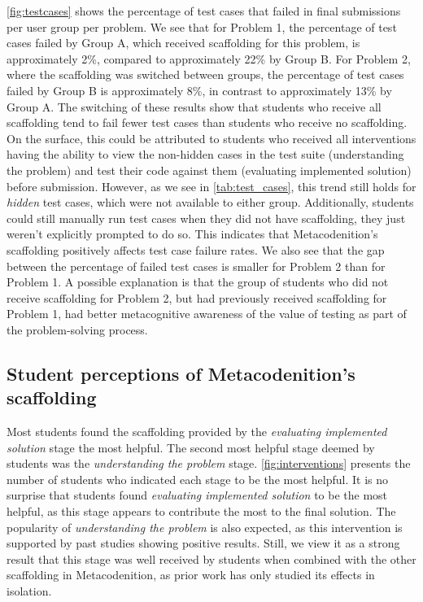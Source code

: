 \documentclass[sigconf,anonymous]{acmart}
\begin{document}
\autoref{fig:testcases} shows the percentage of test cases that failed in final submissions per user group per problem. We see that for Problem 1, the percentage of test cases failed by Group A, which received scaffolding for this problem, is approximately 2\%, compared to approximately 22\% by Group B. For Problem 2, where the scaffolding was switched between groups, the percentage of test cases failed by Group B is approximately 8\%, in contrast to approximately 13\% by Group A. The switching of these results show that students who receive all scaffolding tend to fail fewer test cases than students who receive no scaffolding. On the surface, this could be attributed to students who received all interventions having the ability to view the non-hidden cases in the test suite (understanding the problem) and test their code against them  (evaluating implemented solution) before submission. However, as we see in \autoref{tab:test_cases}, this trend still holds for \emph{hidden} test cases, which were not available to either group. 
Additionally, students could still manually run test cases when they did not have scaffolding, they just weren't explicitly prompted to do so. 
This indicates that Metacodenition's scaffolding positively affects test case failure rates. We also see that the gap between the percentage of failed test cases is smaller for Problem 2 than for Problem 1. A possible explanation is that the group of students who did not receive scaffolding for Problem 2, but had previously received scaffolding for Problem 1, had better metacognitive awareness of the value of testing as part of the problem-solving process. 


\subsection{Student perceptions of Metacodenition's scaffolding} \label{sec:results-questionnaire}
Most students found the scaffolding provided by the \emph{evaluating implemented solution} stage the most helpful. The second most helpful stage deemed by students was the \emph{understanding the problem} stage. \autoref{fig:interventions} presents the number of students who indicated each stage to be the most helpful. It is no surprise that students found \emph{evaluating implemented solution} to be the most helpful, as this stage appears to contribute the most to the final solution. The popularity of \emph{understanding the problem} is also expected, as this intervention is supported by past studies showing positive results. Still, we view it as a strong result that this stage was well received by students when combined with the other scaffolding in Metacodenition, as prior  work has only  studied its effects in isolation.
\end{document}
